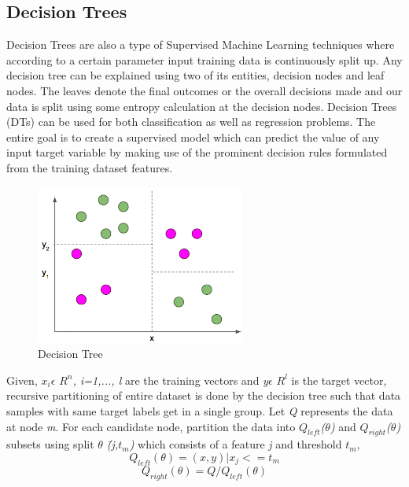 \documentclass[a4paper, 10pt, conference]{IEEEtran}
\begin{document}
\subsection{Decision Trees}
Decision Trees are also a type of Supervised Machine Learning techniques where according to a certain parameter input training data is continuously split up. Any decision tree can be explained using two of its entities, decision nodes and leaf nodes. The leaves denote the final outcomes or the overall decisions made and our data is split using some entropy calculation at the decision nodes.
Decision Trees (DTs) can be used for both classification as well as regression problems. The entire goal is to create a supervised model which can predict the value of any input target variable by making use of the prominent decision rules formulated from the training dataset features.
\begin{figure}
  \includegraphics[width=\linewidth]{DecisionTree.png}
  \caption{Decision Tree}
  \label{fig:dt}
\end{figure}

Given, \textit{$x_{i}\epsilon$ $R^{n}$, i=1,..., l} are the training vectors and \textit{y$\epsilon$ $R^{l}$} is the target vector, recursive partitioning of entire dataset is done by the decision tree such that data samples with same target labels get in a single group. Let \textit{Q} represents the data at node \textit{m}. For each candidate node, partition the data into \textit{$Q_{left}$($\theta$)} and \textit{$Q_{right}$($\theta$)} subsets using split \textit{$\theta$ \= (j,$t_{m}$)} which consists of a feature \textit{j} and threshold \textit{$t_{m}$},
\[ Q_{left}(\theta) = (x,y)|x_{j}<=t_{m}
\]
\[ Q_{right}(\theta) = Q/Q_{left}(\theta)
\]
\end{document}
